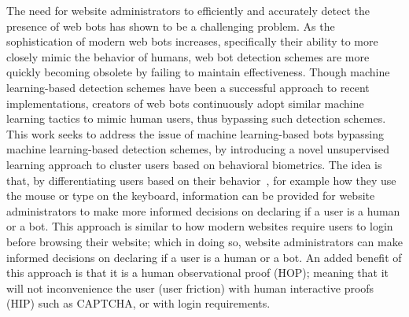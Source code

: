 The need for website administrators to efficiently and accurately detect the presence of web bots has shown to be a challenging problem. As the sophistication of modern web bots increases, specifically their ability to more closely mimic the behavior of humans, web bot detection schemes are more quickly becoming obsolete by failing to maintain effectiveness. Though machine learning-based detection schemes have been a successful approach to recent implementations, creators of web bots continuously adopt similar machine learning tactics to mimic human users, thus bypassing such detection schemes. This work seeks to address the issue of machine learning-based bots bypassing machine learning-based detection schemes, by introducing a novel unsupervised learning approach to cluster users based on behavioral biometrics. The idea is that, by differentiating users based on their behavior~\cite{FEHER201219}, for example how they use the mouse or type on the keyboard, information can be provided for website administrators to make more informed decisions on declaring if a user is a human or a bot. This approach is similar to how modern websites require users to login before browsing their website; which in doing so, website administrators can make informed decisions on declaring if a user is a human or a bot. An added benefit of this approach is that it is a human observational proof (HOP); meaning that it will not inconvenience the user (user friction) with human interactive proofs (HIP) such as CAPTCHA, or with login requirements.